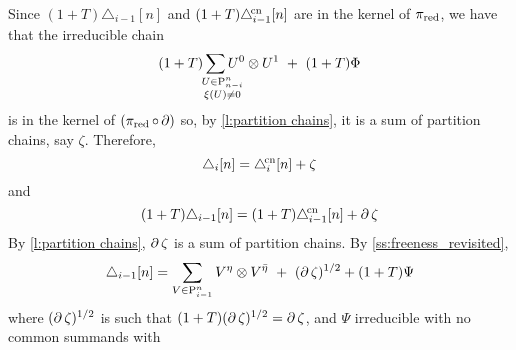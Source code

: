 Since $(1+T)\triangle_{i-1}[n]$ and $(1+T)\triangle^{\!\mathrm{cn}}_{i-1}[n]$ are in the kernel of $\operatorname{\pi_{\text{red}}}$, we have that the irreducible chain
\[
(1+T)\sum_{\quad\mathclap{\substack{U \in \P_{n-i}^n \\ \xi(U) \neq 0}}} U^0 \ot U^1 \ +\
(1+T)\Phi
\]
is in the kernel of $(\operatorname{\pi_{\text{red}}} \circ \operatorname{\partial})$ so, by \cref{l:partition chains}, it is a sum of partition chains, say $\zeta$.
Therefore,
\[
\triangle_i[n] = \triangle^{\!\mathrm{cn}}_i[n] + \zeta
\]
and
\[
(1+T)\triangle_{i-1}[n] = (1+T)\triangle^{\!\mathrm{cn}}_{i-1}[n] + \operatorname{\partial}\zeta
\]
By \cref{l:partition chains}, $\operatorname{\partial} \zeta$ is a sum of partition chains.
By \cref{ss:freeness_revisited},
\[
\triangle_{i-1}[n] = \sum_{V \in \mathrm{P}_{i-1}^n} V^\eta \otimes V^{\bar{\eta}} \ +\
(\operatorname{\partial}\zeta)^{1/2} +
(1+T)\Psi
\]
where $(\operatorname{\partial}\zeta)^{1/2}$ is such that $(1+T)(\operatorname{\partial}\zeta)^{1/2} = \operatorname{\partial}\zeta$, and $\Psi$ irreducible with no common summands with




